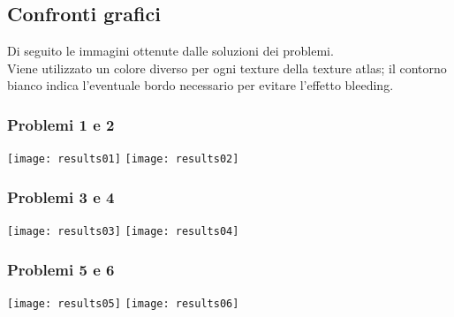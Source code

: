 \newpage

\subsection{Confronti grafici}

Di seguito le immagini ottenute dalle soluzioni dei problemi. \\
Viene utilizzato un colore diverso per ogni texture della texture atlas; il contorno bianco indica l'eventuale bordo necessario per evitare l'effetto bleeding. 


\subsubsection{Problemi 1 e 2}
\begin{minipage}{\textwidth}
\centering
\texttt{[image: results01]}
\hspace{1cm}
\texttt{[image: results02]}
\end{minipage}

\subsubsection{Problemi 3 e 4}
\begin{minipage}{\textwidth}
\centering
\texttt{[image: results03]}
\hspace{1cm}
\texttt{[image: results04]}
\end{minipage}

\subsubsection{Problemi 5 e 6}
\begin{minipage}{\textwidth}
\centering
\texttt{[image: results05]}
\hspace{1cm}
\texttt{[image: results06]}
\end{minipage}






\iffalse

